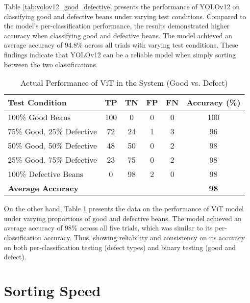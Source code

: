 Table \ref{tab:yolov12_good_defective} presents the performance of YOLOv12 on classifying good and defective beans under varying test conditions. Compared to the model’s per-classification performance, the results demonstrated higher accuracy  when classifying good and defective beans. The model achieved an average accuracy of  94.8\% across all trials with varying test conditions. These findings indicate that YOLOv12 can be a reliable model when simply sorting between the two classifications.

\begin{table}[ht]
	\centering
	\small
	\caption{Actual Performance of ViT in the System (Good vs. Defect)}
	\begin{tabularx}{\linewidth}{@{}>{\raggedright}X c c c c c@{}}
	\toprule
	\textbf{Test Condition} & \textbf{TP} & \textbf{TN} & \textbf{FP} & \textbf{FN} & \textbf{Accuracy (\%)} \\
	\midrule
	100\% Good Beans & 100 & 0 & 0 & 0 & 100 \\
	75\% Good, 25\% Defective & 72 & 24 & 1 & 3 & 96 \\
	50\% Good, 50\% Defective & 48 & 50 & 0 & 2 & 98 \\
	25\% Good, 75\% Defective & 23 & 75 & 0 & 2 & 98 \\
	100\% Defective Beans & 0 & 98 & 2 & 0 & 98 \\
	\bottomrule
	\textbf{Average Accuracy} & & & & & \textbf{98} \\
	\end{tabularx}
	\label{tab:vit_good_defective}
\end{table}

On the other hand, Table \ref{tab:vit_good_defective} presents the data on the performance of ViT model under varying proportions of good and defective beans. The model achieved an average accuracy of 98\% across all five trials, which was similar to its per-classification accuracy. Thus, showing reliability and consistency on its accuracy on both per-classification testing (defect types) and binary testing (good and defect).

\newpage
\section{Sorting Speed}

